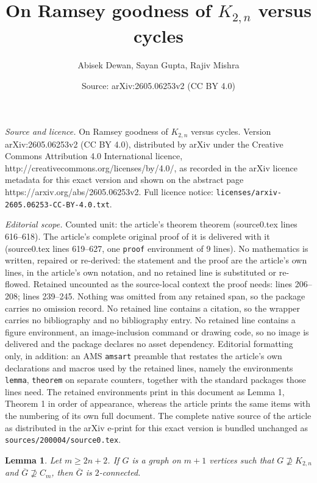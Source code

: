 \documentclass[10pt,a4paper]{amsart}
\title{On Ramsey goodness of $K_{2,n}$ versus cycles}
\author{Abisek Dewan, Sayan Gupta, Rajiv Mishra}
\date{Source: arXiv:2605.06253v2 (CC BY 4.0)}
\newtheorem{lemma}{Lemma}
\begin{document}
\maketitle

\noindent\emph{Source and licence.} On Ramsey goodness of $K_{2,n}$ versus cycles. Version arXiv:2605.06253v2 (CC BY 4.0), distributed by arXiv under the Creative Commons Attribution 4.0 International licence, http://creativecommons.org/licenses/by/4.0/, as recorded in the arXiv licence metadata for this exact version and shown on the abstract page https://arxiv.org/abs/2605.06253v2. Full licence notice: \texttt{licenses/arxiv-2605.06253-CC-BY-4.0.txt}.\par\smallskip

\noindent\textit{Editorial scope.} Counted unit: the article's theorem theorem (source0.tex lines 616--618). The article's complete original proof of it is delivered with it (source0.tex lines 619--627, one \texttt{proof} environment of 9 lines). No mathematics is written, repaired or re-derived: the statement and the proof are the article's own lines, in the article's own notation, and no retained line is substituted or re-flowed.  Retained uncounted as the source-local context the proof needs: lines 206--208; lines 239--245.  Nothing was omitted from any retained span, so the package carries no omission record.  No retained line contains a citation, so the wrapper carries no bibliography and no bibliography entry.  No retained line contains a figure environment, an image-inclusion command or drawing code, so no image is delivered and the package declares no asset dependency.  Editorial formatting only, in addition: an AMS \texttt{amsart} preamble that restates the article's own declarations and macros used by the retained lines, namely the environments \texttt{lemma}, \texttt{theorem} on separate counters, together with the standard packages those lines need.  The retained environments print in this document as Lemma 1, Theorem 1 in order of appearance, whereas the article prints the same items with the numbering of its own full document.  The complete native source of the article as distributed in the arXiv e-print for this exact version is bundled unchanged as \texttt{sources/200004/source0.tex}.
\begin{lemma}\label{2-connected lemma}
    Let $m\geq 2n+2$. If $G$ is a graph on $m+1$ vertices such that $ G\nsupseteq K_{2,n}$ and  $\overline{G}\nsupseteq C_{m}$, then $\overline{G}$ is $2$-connected. 
\end{lemma}
\end{document}
